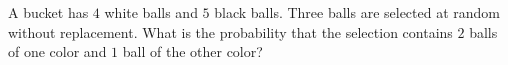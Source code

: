 A bucket has $4$ white balls and $5$ black balls. Three balls are selected at random without replacement. What is the probability that the selection contains $2$ balls of one color and $1$ ball of the other color?
